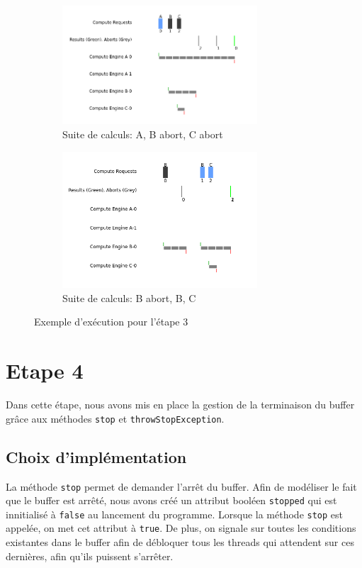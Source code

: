 \documentclass{article}
\begin{document}
\begin{figure}[h]
    \begin{subfigure}{0.45\textwidth}
        \centering
        \includegraphics[width=0.8\textwidth]{figures/A_B_Abort_C_Abort}
        \caption{Suite de calculs: A, B abort, C abort}
    \end{subfigure}
    \begin{subfigure}{0.45\textwidth}
        \centering
        \includegraphics[width=0.8\textwidth]{figures/B_Abort_B_C}
        \caption{Suite de calculs: B abort, B, C}
    \end{subfigure}
    \caption{Exemple d'exécution pour l'étape 3}
    \label{fig:full3}
\end{figure}

\pagebreak

\section{Etape 4}
Dans cette étape, nous avons mis en place la gestion de la terminaison du buffer grâce aux méthodes \texttt{stop}
et \texttt{throwStopException}.

\subsection{Choix d'implémentation}
La méthode \texttt{stop} permet de demander l'arrêt du buffer.  Afin de modéliser
le fait que le buffer est arrêté, nous avons créé un attribut booléen \texttt{stopped} qui est innitialisé à \texttt{false}
au lancement du programme. Lorsque la méthode \texttt{stop} est appelée, on met cet attribut à \texttt{true}. De plus,
on signale sur toutes les conditions existantes dans le buffer afin de débloquer tous les threads qui attendent sur
ces dernières, afin qu'ils puissent s'arrêter.
\end{document}
